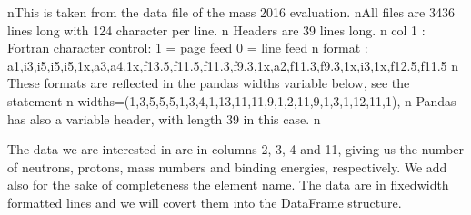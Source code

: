\documentclass[letterpaper,10pt,english]{sphinxmanual}
\begin{document}
\begin{sphinxVerbatim}[commandchars=\\\{\}]
\PYGZsq{}                                                                                                                         \PYGZbs{}nThis is taken from the data file of the mass 2016 evaluation.                                                               \PYGZbs{}nAll files are 3436 lines long with 124 character per line.                                                                  \PYGZbs{}n       Headers are 39 lines long.                                                                                           \PYGZbs{}n   col 1     :  Fortran character control: 1 = page feed  0 = line feed                                                     \PYGZbs{}n   format    :  a1,i3,i5,i5,i5,1x,a3,a4,1x,f13.5,f11.5,f11.3,f9.3,1x,a2,f11.3,f9.3,1x,i3,1x,f12.5,f11.5                     \PYGZbs{}n   These formats are reflected in the pandas widths variable below, see the statement                                       \PYGZbs{}n   widths=(1,3,5,5,5,1,3,4,1,13,11,11,9,1,2,11,9,1,3,1,12,11,1),                                                            \PYGZbs{}n   Pandas has also a variable header, with length 39 in this case.                                                          \PYGZbs{}n\PYGZsq{}
\end{sphinxVerbatim}

The data we are interested in are in columns 2, 3, 4 and 11, giving us
the number of neutrons, protons, mass numbers and binding energies,
respectively. We add also for the sake of completeness the element name. The data are in fixed\sphinxhyphen{}width formatted lines and we will
covert them into the  DataFrame structure.
\end{document}
